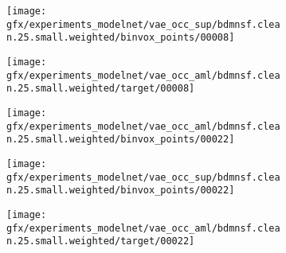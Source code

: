 \begin{figure}[t!]
\begin{subfigure}[t]{0.075\textwidth}
    \end{subfigure}
    \begin{subfigure}[t]{0.075\textwidth}
        \vspace{0px}
        \centering
        \texttt{[image: gfx/experiments\_modelnet/vae\_occ\_sup/bdmnsf.clean.25.small.weighted/binvox\_points/00008]}
    \end{subfigure}
    \begin{subfigure}[t]{0.075\textwidth}
        \vspace{0px}
        \centering
        \texttt{[image: gfx/experiments\_modelnet/vae\_occ\_aml/bdmnsf.clean.25.small.weighted/target/00008]}
    \end{subfigure}
    \begin{subfigure}[t]{0.075\textwidth}
        \vspace{0px}
        \centering
        \texttt{[image: gfx/experiments\_modelnet/vae\_occ\_aml/bdmnsf.clean.25.small.weighted/binvox\_points/00022]}
    \end{subfigure}
    \begin{subfigure}[t]{0.075\textwidth}
        \vspace{0px}
        \centering
        \texttt{[image: gfx/experiments\_modelnet/vae\_occ\_sup/bdmnsf.clean.25.small.weighted/binvox\_points/00022]}
    \end{subfigure}
    \begin{subfigure}[t]{0.075\textwidth}
        \vspace{0px}
        \centering
        \texttt{[image: gfx/experiments\_modelnet/vae\_occ\_aml/bdmnsf.clean.25.small.weighted/target/00022]}
    \end{subfigure}
    \vspace*{-6px}
    \caption{}
    \label{fig:experiments-modelnet}
    \vspace*{-0.25cm}
\end{figure}
